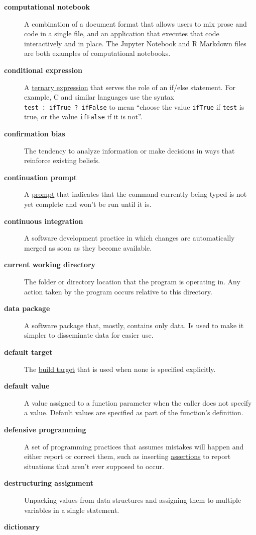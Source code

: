\documentclass[
]{krantz}
\begin{document}
\begin{description}
\item[\textbf{computational notebook}]
A combination of a document format that allows users to mix prose and code in a single file, and an application that executes that code interactively and in place. The Jupyter Notebook and R Markdown files are both examples of computational notebooks.
\item[\textbf{conditional expression}]
A \protect\hyperlink{ternary_expression}{ternary expression} that serves the role of an if/else statement. For example, C and similar languages use the syntax \texttt{test\ :\ ifTrue\ ?\ ifFalse} to mean ``choose the value \texttt{ifTrue} if \texttt{test} is true, or the value \texttt{ifFalse} if it is not''.
\item[\textbf{confirmation bias}]
The tendency to analyze information or make decisions in ways that reinforce existing beliefs.
\item[\textbf{continuation prompt}]
A \protect\hyperlink{prompt}{prompt} that indicates that the command currently being typed is not yet complete and won't be run until it is.
\item[\textbf{continuous integration}]
A software development practice in which changes are automatically merged as soon as they become available.
\item[\textbf{current working directory}]
The folder or directory location that the program is operating in. Any action taken by the program occurs relative to this directory.
\item[\textbf{data package}]
A software package that, mostly, contains only data. Is used to make it simpler to disseminate data for easier use.
\item[\textbf{default target}]
The \protect\hyperlink{build_target}{build target} that is used when none is specified explicitly.
\item[\textbf{default value}]
A value assigned to a function parameter when the caller does not specify a value. Default values are specified as part of the function's definition.
\item[\textbf{defensive programming}]
A set of programming practices that assumes mistakes will happen and either report or correct them, such as inserting \protect\hyperlink{assertion}{assertions} to report situations that aren't ever supposed to occur.
\item[\textbf{destructuring assignment}]
Unpacking values from data structures and assigning them to multiple variables in a single statement.
\item[\textbf{dictionary}]

\end{description}
\end{document}
